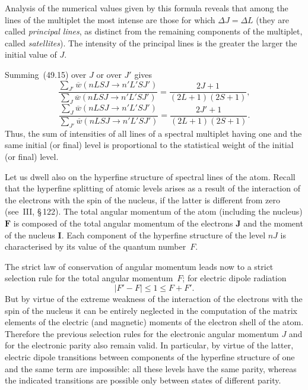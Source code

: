 Analysis of the numerical values given by this formula reveals that among the lines of the multiplet the most intense are those for which $\Delta J = \Delta L$ (they are called \textit{principal lines}, as distinct from the remaining components of the multiplet, called \textit{satellites}). The intensity of the principal lines is the greater the larger the initial value of $J$.

Summing~(49.15) over $J$ or over $J'$ gives
\begin{equation}
\frac{\sum_{J'}\overline{w}(nLSJ \to n'L'SJ')}{\sum_J\overline{w}(nLSJ \to n'L'SJ')} = \frac{2J+1}{(2L+1)(2S+1)},
\tag{49.16}
\end{equation}
\[
\frac{\sum_J\overline{w}(nLSJ \to n'L'SJ')}{\sum_{J'}\overline{w}(nLSJ \to n'L'SJ')} = \frac{2J'+1}{(2L+1)(2S+1)}.
\]
Thus, the sum of intensities of all lines of a spectral multiplet having one and the same initial (or final) level is proportional to the statistical weight of the initial (or final) level.

Let us dwell also on the hyperfine structure of spectral lines of the atom. Recall that the hyperfine splitting of atomic levels arises as a result of the interaction of the electrons with the spin of the nucleus, if the latter is different from zero (see~III, \S\,122). The total angular momentum of the atom (including the nucleus) $\mathbf{F}$ is composed of the total angular momentum of the electrons $\mathbf{J}$ and the moment of the nucleus $\mathbf{I}$. Each component of the hyperfine structure of the level $nJ$ is characterised by its value of the quantum number~$F$.

The strict law of conservation of angular momentum leads now to a strict selection rule for the total angular momentum~$F$; for electric dipole radiation
\begin{equation}
|F' - F| \leqslant 1 \leqslant F + F'.
\tag{49.17}
\end{equation}
But by virtue of the extreme weakness of the interaction of the electrons with the spin of the nucleus it can be entirely neglected in the computation of the matrix elements of the electric (and magnetic) moments of the electron shell of the atom. Therefore the previous selection rules for the electronic angular momentum $J$ and for the electronic parity also remain valid. In particular, by virtue of the latter, electric dipole transitions between components of the hyperfine structure of one and the same term are impossible: all these levels have the same parity, whereas the indicated transitions are possible only between states of different parity.


